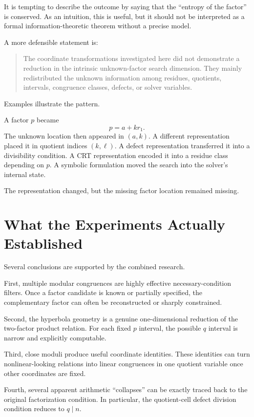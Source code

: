 \documentclass[11pt,a4paper]{article}
\begin{document}
It is tempting to describe the outcome by saying that the ``entropy of the factor'' is conserved. As an intuition, this is useful, but it should not be interpreted as a formal information-theoretic theorem without a precise model.

A more defensible statement is:

\begin{quote}
The coordinate transformations investigated here did not demonstrate a reduction in the intrinsic unknown-factor search dimension. They mainly redistributed the unknown information among residues, quotients, intervals, congruence classes, defects, or solver variables.
\end{quote}

Examples illustrate the pattern.

A factor $p$ became
\[
    p=a+kr_1.
\]
The unknown location then appeared in $(a,k)$. A different representation placed it in quotient indices $(k,\ell)$. A defect representation transferred it into a divisibility condition. A CRT representation encoded it into a residue class depending on $p$. A symbolic formulation moved the search into the solver's internal state.

The representation changed, but the missing factor location remained missing.

\section{What the Experiments Actually Established}

Several conclusions are supported by the combined research.

First, multiple modular congruences are highly effective necessary-condition filters. Once a factor candidate is known or partially specified, the complementary factor can often be reconstructed or sharply constrained.

Second, the hyperbola geometry is a genuine one-dimensional reduction of the two-factor product relation. For each fixed $p$ interval, the possible $q$ interval is narrow and explicitly computable.

Third, close moduli produce useful coordinate identities. These identities can turn nonlinear-looking relations into linear congruences in one quotient variable once other coordinates are fixed.

Fourth, several apparent arithmetic ``collapses'' can be exactly traced back to the original factorization condition. In particular, the quotient-cell defect division condition reduces to $q\mid n$.
\end{document}
